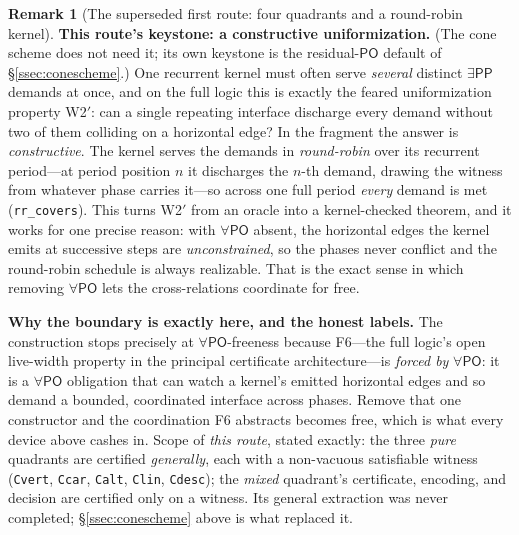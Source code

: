 \documentclass[11pt]{article}
\newcommand{\PO}{\mathsf{PO}}
\newcommand{\PP}{\mathsf{PP}}
\newcommand{\code}[1]{\texttt{#1}}
\theoremstyle{plain}
\theoremstyle{definition}
\newtheorem{remark}[theorem]{Remark}
\begin{document}
\begin{remark}[The superseded first route: four quadrants and a round-robin
kernel]
\textbf{This route's keystone: a constructive uniformization.} (The cone
scheme does not need it; its own keystone is the residual-$\PO$ default of
\S\ref{ssec:conescheme}.) One recurrent kernel
must often serve \emph{several} distinct $\exists\PP$ demands at once, and on
the full logic this is exactly the feared uniformization property W2$'$: can a
single repeating interface discharge every demand without two of them colliding
on a horizontal edge? In the fragment the answer is \emph{constructive}. The
kernel serves the demands in \emph{round-robin} over its recurrent period---at
period position $n$ it discharges the $n$-th demand, drawing the witness from
whatever phase carries it---so across one full period \emph{every} demand is
met (\code{rr\_covers}). This turns W2$'$ from an oracle into a kernel-checked
theorem, and it works for one precise reason: with $\forall\PO$ absent, the
horizontal edges the kernel emits at successive steps are \emph{unconstrained},
so the phases never conflict and the round-robin schedule is always realizable.
That is the exact sense in which removing $\forall\PO$ lets the cross-relations
coordinate for free.

\textbf{Why the boundary is exactly here, and the honest labels.} The
construction stops precisely at $\forall\PO$-freeness because F6---the full
logic's open live-width property in the principal certificate
architecture---is \emph{forced by} $\forall\PO$: it is a
$\forall\PO$ obligation that can watch a kernel's emitted horizontal edges and
so demand a bounded, coordinated interface across phases. Remove that one
constructor and the coordination F6 abstracts becomes free, which is what every
device above cashes in. Scope of \emph{this route}, stated exactly: the three
\emph{pure} quadrants are certified \emph{generally}, each with a non-vacuous
satisfiable witness (\code{Cvert}, \code{Ccar}, \code{Calt}, \code{Clin},
\code{Cdesc}); the \emph{mixed} quadrant's certificate, encoding, and decision
are certified only on a witness. Its general extraction was never completed;
\S\ref{ssec:conescheme} above is what replaced it.




\end{remark}
\end{document}
